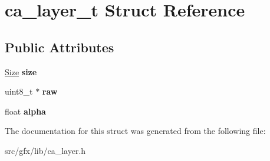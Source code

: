 \hypertarget{structca__layer__t}{}\section{ca\+\_\+layer\+\_\+t Struct Reference}
\label{structca__layer__t}
\subsection*{Public Attributes}
\begin{DoxyCompactItemize}
\item 
\mbox{\label{structca__layer__t_a950f93e8b3a1d31709f95883c9449d0d}} 
\hyperlink{structsize}{Size} {\bfseries size}
\item 
\mbox{\label{structca__layer__t_a5244208ae5eac0458e2357c65401e899}} 
uint8\+\_\+t $\ast$ {\bfseries raw}
\item 
\mbox{\label{structca__layer__t_ab88a09156167c5b54ec43e8a86d6d8c6}} 
float {\bfseries alpha}
\end{DoxyCompactItemize}


The documentation for this struct was generated from the following file\+:\begin{DoxyCompactItemize}
\item 
src/gfx/lib/ca\+\_\+layer.\+h\end{DoxyCompactItemize}
